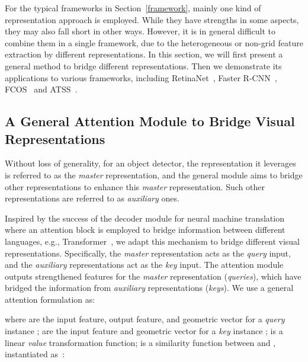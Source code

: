 \documentclass{article}
\def\eg{{e.g.}}
\begin{document}
\vspace*{-0.5em}

For the typical frameworks in Section~\ref{framework}, mainly one kind of representation approach is employed. While they have strengths in some aspects, they may also fall short in other ways. However, it is in general difficult to combine them in a single framework, due to the heterogeneous or non-grid feature extraction by different representations. In this section, we will first present a general method to bridge different representations. Then we demonstrate its applications to various frameworks, including RetinaNet~\cite{RetinaNet}, Faster R-CNN~\cite{ren2015faster}, FCOS~\cite{FCOS} and ATSS~\cite{zhang2019bridging}.

\vspace*{-0.5em}

\subsection{A General Attention Module to Bridge Visual Representations}
\label{section:bvr}

\vspace*{-0.5em}

Without loss of generality, for an object detector, the representation it leverages is referred to as the \emph{master} representation, and the general module aims to bridge other representations to enhance this \emph{master} representation. Such other representations are referred to as \emph{auxiliary} ones.

Inspired by the success of the decoder module for neural machine translation where an attention block is employed to bridge information between different languages, \eg, Transformer~\cite{vaswani2017attention}, we adapt this mechanism to bridge different visual representations. Specifically, the \emph{master} representation acts as the \emph{query} input, and the \emph{auxiliary} representations act as the \emph{key} input. The attention module outputs strengthened features for the \emph{master} representation (\emph{queries}), which have bridged the information from \emph{auxiliary} representations (\emph{keys}). We use a general attention formulation as:

where  are the input feature, output feature, and geometric vector for a \emph{query} instance ;  are the input feature and geometric vector for a \emph{key} instance ;  is a linear \emph{value} transformation function;  is a similarity function between  and , instantiated as~\cite{hu2018relation}:
\end{document}
